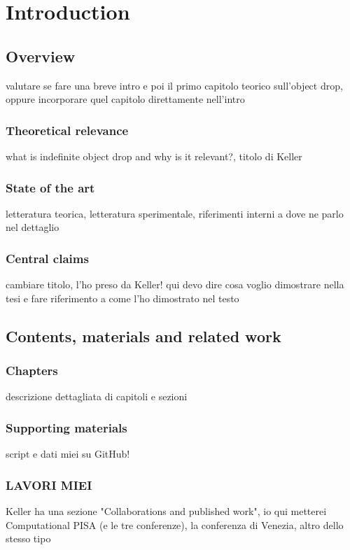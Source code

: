 \setchapterpreamble[u]{\margintoc}
\chapter{Introduction}

\section{Overview} 

 valutare se fare una breve intro e poi il primo capitolo teorico sull'object drop, oppure incorporare quel capitolo direttamente nell'intro

\subsection{Theoretical relevance}
what is indefinite object drop and why is it relevant?, titolo di Keller

\subsection{State of the art}
letteratura teorica, letteratura sperimentale, riferimenti interni a dove ne parlo nel dettaglio

\subsection{Central claims}
cambiare titolo, l'ho preso da Keller! qui devo dire cosa voglio dimostrare nella tesi e fare riferimento a come l'ho dimostrato nel testo


\section{Contents, materials and related work} 

\subsection{Chapters}
descrizione dettagliata di capitoli e sezioni

\subsection{Supporting materials}
script e dati miei su GitHub!

\subsection{LAVORI MIEI}
Keller ha una sezione "Collaborations and published work", io qui metterei Computational PISA (e le tre conferenze), la conferenza di Venezia, altro dello stesso tipo



